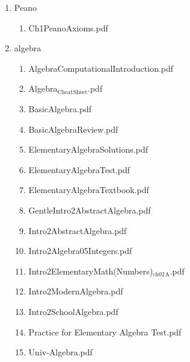 \documentclass[11pt]{article}
\begin{document}
\begin{enumerate}
\item Peano
\label{sec-1-1-1-1-29-21}
\begin{enumerate}
\item Ch1PeanoAxioms.pdf
\label{sec-1-1-1-1-29-21-1}
\end{enumerate}

\item algebra
\label{sec-1-1-1-1-29-22}
\begin{enumerate}
\item AlgebraComputationalIntroduction.pdf
\label{sec-1-1-1-1-29-22-1}

\item Algebra$_{\text{Cheat}}$$_{\text{Sheet}}$.pdf
\label{sec-1-1-1-1-29-22-2}

\item BasicAlgebra.pdf
\label{sec-1-1-1-1-29-22-3}

\item BasicAlgebraReview.pdf
\label{sec-1-1-1-1-29-22-4}

\item ElementaryAlgebraSolutions.pdf
\label{sec-1-1-1-1-29-22-5}

\item ElementaryAlgebraTest.pdf
\label{sec-1-1-1-1-29-22-6}

\item ElementaryAlgebraTextbook.pdf
\label{sec-1-1-1-1-29-22-7}

\item GentleIntro2AbstractAlgebra.pdf
\label{sec-1-1-1-1-29-22-8}

\item Intro2AbstractAlgebra.pdf
\label{sec-1-1-1-1-29-22-9}

\item Intro2Algebra05Integers.pdf
\label{sec-1-1-1-1-29-22-10}

\item Intro2ElementaryMath(Numbers)$_{\text{ch02}}$$_{\text{A}}$.pdf
\label{sec-1-1-1-1-29-22-11}

\item Intro2ModernAlgebra.pdf
\label{sec-1-1-1-1-29-22-12}

\item Intro2SchoolAlgebra.pdf
\label{sec-1-1-1-1-29-22-13}

\item Practice for Elementary Algebra Test.pdf
\label{sec-1-1-1-1-29-22-14}

\item Univ-Algebra.pdf
\label{sec-1-1-1-1-29-22-15}


\end{enumerate}
\end{enumerate}
\end{document}
